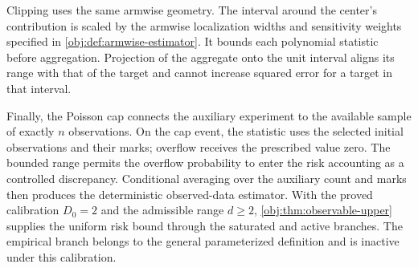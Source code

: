 Clipping uses the same armwise geometry. The interval around the center's contribution is scaled by the armwise localization widths and sensitivity weights specified in \cref{obj:def:armwise-estimator}. It bounds each polynomial statistic before aggregation. Projection of the aggregate onto the unit interval aligns its range with that of the target and cannot increase squared error for a target in that interval.

Finally, the Poisson cap connects the auxiliary experiment to the available sample of exactly \(n\) observations. On the cap event, the statistic uses the selected initial observations and their marks; overflow receives the prescribed value zero. The bounded range permits the overflow probability to enter the risk accounting as a controlled discrepancy. Conditional averaging over the auxiliary count and marks then produces the deterministic observed-data estimator. With the proved calibration \(D_0=2\) and the admissible range \(d\ge2\), \cref{obj:thm:observable-upper} supplies the uniform risk bound through the saturated and active branches. The empirical branch belongs to the general parameterized definition and is inactive under this calibration.
